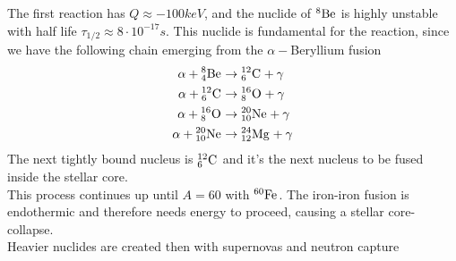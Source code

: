\documentclass[../qm.tex]{subfiles}
\begin{document}
The first reaction has $Q\approx-100\unit{keV}$, and the nuclide of $\nuc{Be}{8}{}$ is highly unstable with half life $\tau_{1/2}\approx8\cdot10^{-17}s$. This nuclide is fundamental for the reaction, since we have the following chain emerging from the $\alpha-$Beryllium fusion
\begin{equation}
	\begin{aligned}
		\alpha+\nuc{Be}{8}{4}&\to\nuc{C}{12}{6}+\gamma\\
		\alpha+\nuc{C}{12}{6}&\to\nuc{O}{16}{8}+\gamma\\
		\alpha+\nuc{O}{16}{8}&\to\nuc{Ne}{20}{10}+\gamma\\
		\alpha+\nuc{Ne}{20}{10}&\to\nuc{Mg}{24}{12}+\gamma
	\end{aligned}
	\label{eq:alphachain}
\end{equation}
The next tightly bound nucleus is $\nuc{C}{12}{6}$ and it's the next nucleus to be fused inside the stellar core.\\
This process continues up until $A=60$ with $\nuc{Fe}{60}{}$. The iron-iron fusion is endothermic and therefore needs energy to proceed, causing a stellar core-collapse.\\
Heavier nuclides are created then with supernovas and neutron capture
\end{document}
